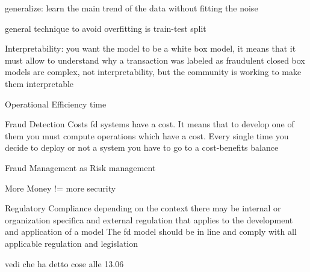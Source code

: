                generalize: learn the main trend of the data without fitting the noise 

                general technique to avoid overfitting is train-test split 

Interpretability: you want the model to be a white box model, it means that it must allow to understand why a transaction was labeled as fraudulent
                closed box models are complex, not interpretability, but the community is working to make them interpretable 

Operational Efficiency 
                time 

Fraud Detection Costs 
                fd systems have a cost. It means that to develop one of them you must compute operations which have a cost. Every single time you decide to deploy or not a system you have to go to a cost-benefits balance 

Fraud Management as Risk management 

More Money != more security 

Regulatory Compliance
    depending on the context there may be internal or organization specifica and external regulation that applies to the development and application of a model 
    The fd model should be in line and comply with all applicable regulation and legislation 

    vedi che ha detto cose alle 13.06